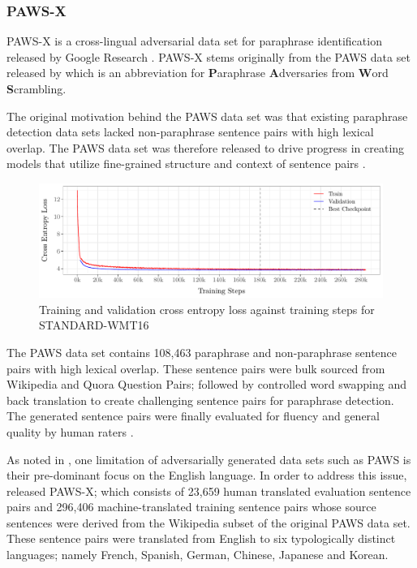 \documentclass[11pt,a4paper]{article}
\begin{document}
\subsubsection{PAWS-X}

PAWS-X is a cross-lingual adversarial data set for paraphrase identification
released by Google Research \citep{pawsx2019emnlp}. PAWS-X stems originally from
the PAWS data set released by \citet{zhang2019paws} which is an abbreviation for
\textbf{P}araphrase \textbf{A}dversaries from \textbf{W}ord \textbf{S}crambling.

The original motivation behind the PAWS data set was that existing paraphrase
detection data sets lacked non-paraphrase sentence pairs with high lexical
overlap. The PAWS data set was therefore released to drive progress in creating
models that utilize fine-grained structure and context of sentence pairs
\cite{zhang2019paws}.

\begin{figure}
  \centering \includegraphics[trim={0cm 0cm 0cm
    0cm},clip,width=\textwidth]{transformer_nmt_evolution.pdf}
  \caption{Training and validation cross entropy loss against training steps for
    STANDARD-WMT16}
  \label{transformer_nmt_evolution}
\end{figure}

The PAWS data set contains 108,463 paraphrase and non-paraphrase sentence pairs
with high lexical overlap. These sentence pairs were bulk sourced from Wikipedia
and Quora Question Pairs; followed by controlled word swapping and back
translation to create challenging sentence pairs for paraphrase detection. The
generated sentence pairs were finally evaluated for fluency and general quality
by human raters \cite{zhang2019paws}.

As noted in \citet{pawsx2019emnlp}, one limitation of adversarially generated
data sets such as PAWS is their pre-dominant focus on the English language. In
order to address this issue, \citet{pawsx2019emnlp} released PAWS-X; which
consists of 23,659 human translated evaluation sentence pairs and 296,406
machine-translated training sentence pairs whose source sentences were derived
from the Wikipedia subset of the original PAWS data set. These sentence pairs
were translated from English to six typologically distinct languages; namely
French, Spanish, German, Chinese, Japanese and Korean.
\end{document}
